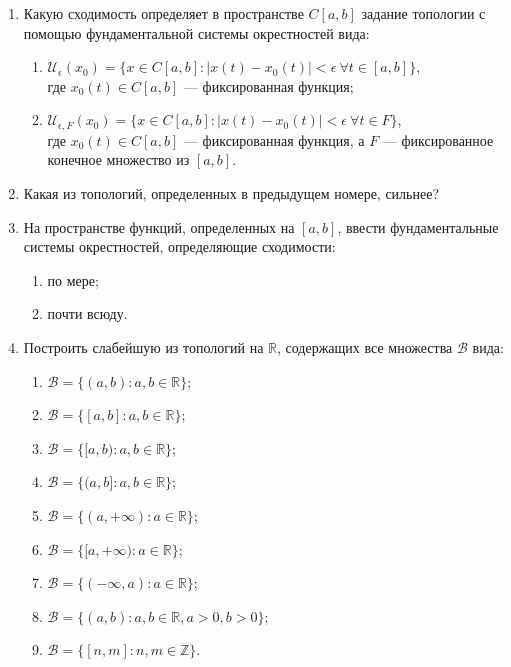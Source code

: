 \documentclass[12pt,a4paper]{article}
\begin{document}
\begin{enumerate}
\item Какую сходимость определяет в пространстве $C[a, b]$ задание топологии с помощью фундаментальной системы окрестностей вида:
\begin{enumerate}[label=\alph*)]
\item $\mathcal{U}_{\epsilon}(x_{0}) = \{x \in C[a, b] : |x(t) - x_{0}(t)| < \epsilon \ \forall t \in [a, b]\}$, \\ где $x_{0}(t) \in C[a, b]$ — фиксированная функция;
\item $\mathcal{U}_{\epsilon, F}(x_{0}) = \{x \in C[a, b] : |x(t) - x_{0}(t)| < \epsilon \ \forall t \in F\}$, \\ где $x_{0}(t) \in C[a, b]$ — фиксированная функция, а $F$ — фиксированное конечное множество из $[a, b]$.
\end{enumerate}

\item Какая из топологий, определенных в предыдущем номере, сильнее?

\item На пространстве функций, определенных на $[a, b]$, ввести фундаментальные системы окрестностей, определяющие сходимости:
\begin{enumerate}[label=\alph*)]
\item по мере;
\item почти всюду.
\end{enumerate}

\item Построить слабейшую из топологий на $\mathbb{R}$, содержащих все множества $\mathcal{B}$ вида:
\begin{enumerate}[label=\alph*)]
\item $\mathcal{B} = \{(a, b) : a, b \in \mathbb{R}\}$;
\item $\mathcal{B} = \{[a, b] : a, b \in \mathbb{R}\}$;
\item $\mathcal{B} = \{[a, b) : a, b \in \mathbb{R}\}$;
\item $\mathcal{B} = \{(a, b] : a, b \in \mathbb{R}\}$;
\item $\mathcal{B} = \{(a, +\infty) : a \in \mathbb{R}\}$;
\item $\mathcal{B} = \{[a, +\infty) : a \in \mathbb{R}\}$;
\item $\mathcal{B} = \{(-\infty, a) : a \in \mathbb{R}\}$;
\item $\mathcal{B} = \{(a, b) : a, b \in \mathbb{R}, a > 0, b > 0\}$;
\item $\mathcal{B} = \{[n, m] : n, m \in \mathbb{Z}\}$.
\end{enumerate}


\end{enumerate}
\end{document}
